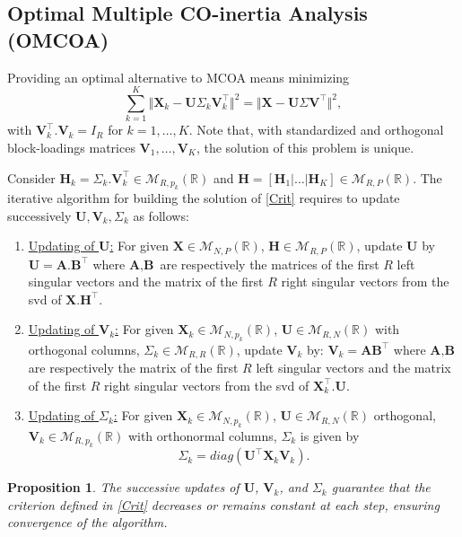 \documentclass[11pt]{article}
\newtheorem{proposition}{Proposition}
\newcommand{\X}{\textbf{X}}
\newcommand{\U}{\textbf{U}}
\newcommand{\V}{\textbf{V}}
\begin{document}
\subsection{Optimal Multiple CO-inertia Analysis (OMCOA)}

Providing an optimal alternative to MCOA means minimizing
\begin{equation}
	\sum_{k=1}^K\Vert \X_k - \U\Sigma_k \V_k^\intercal\Vert^2= \Vert \X- \U \Sigma \V^\intercal\Vert^2, \label{Crit}
\end{equation}
with $\V_k^\intercal.\V_k=I_R$ for $k=1,\ldots,K$. Note that, with standardized and orthogonal block-loadings matrices $\V_1,\ldots,\V_K$, the solution of this problem is unique. 


\noindent Consider $\textbf{H}_k=\Sigma_k.\V^\intercal_k\in \mathcal M_{R,p_k}(\mathbb R)$ and $\textbf{H}=[\textbf{H}_1|\ldots|\textbf{H}_K]\in \mathcal M_{R,P}(\mathbb R)$. The iterative algorithm for building the solution of \eqref{Crit} requires to update successively $\U,\V_k,\Sigma_k$ as follows:
\begin{enumerate}
	\item \underline{Updating of $\U$:}  For given $\textbf{X}\in \mathcal M_{N,P}(\mathbb R)$, $\textbf{H}\in \mathcal M_{R,P}(\mathbb R)$, update $\U$ by $\U=\textbf{A}.\textbf{B}^\intercal$ where $\textbf{A},\textbf{B}$ are respectively the matrices of the first $R$ left singular vectors and the matrix of the first $R$ right singular vectors from the svd of $\textbf{X}.\textbf{H}^\intercal$.
	\item \underline{Updating of $\V_k$:} For given $\textbf{X}_k\in \mathcal M_{N,p_k}(\mathbb R)$, $\U\in \mathcal M_{R,N}(\mathbb R)$ with orthogonal columns, $\Sigma_k\in \mathcal M_{R,R}(\mathbb R)$, update $\V_k$ by: $\V_k=\textbf{A}\textbf{B}^\intercal$  where $\textbf{A},\textbf{B}$ are respectively the matrix of the first $R$ left singular vectors and the matrix of the first $R$ right singular vectors from the svd of $\textbf{X}^\intercal_k.\U$.
	 \item \underline{Updating of $\Sigma_k$:}  For given $\textbf{X}_k\in \mathcal M_{N,p_k}(\mathbb R)$, $\U\in \mathcal M_{R,N}(\mathbb R)$ orthogonal, $\V_k\in \mathcal M_{R,p_k}(\mathbb R)$ with orthonormal columns, $\Sigma_k$ is given by 
	 \[\Sigma_k=diag(\U^\intercal\textbf{X}_k\V_k).\] 
\end{enumerate}

\begin{proposition}
The successive updates of $\U$, $\V_k$, and $\Sigma_k$ guarantee that the criterion defined in \eqref{Crit} decreases or remains constant at each step, ensuring convergence of the algorithm.
\end{proposition}
\end{document}
